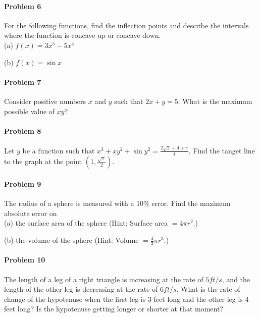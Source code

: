 \documentclass[a4paper,11pt]{article}
\begin{document}
\vspace{2in}

\paragraph{Problem 6}

For the following functions, find the inflection points and describe the intervals where the function is concave up or concave down.\\

(a) $f(x) = 3x^5 - 5x^4$
\vspace{1.5in}

(b) $f(x) = \sin x$
\vspace{1.5in}

\paragraph{Problem 7}
Consider positive numbers $x$ and $y$ such that $2x+y = 5$.  What is the maximum possible value of $xy$?
\vspace{1.5in}

\paragraph{Problem 8}
Let $y$ be a function such that $x^3+xy^2+\sin{y^2} = \frac{2\sqrt{2}+4+\pi}{4}$.  Find the tanget line to the graph at the point $(1, \frac{\sqrt{\pi}}{2})$.
\vspace{2in}

\paragraph{Problem 9}
The radius of a sphere is measured with a $10\%$ error.  Find the maximum absolute error on\\

(a) the surface area of the sphere (Hint: Surface area $= 4 \pi r^2$.)
\vspace{1.5in}

(b) the volume of the sphere
(Hint: Volume $= \frac{4}{3} \pi r^3$.)
\vspace{1.5in}

\paragraph{Problem 10}
The length of a leg of a right triangle is increasing at the rate of $5 ft/s$, and the length of the other leg is decreasing at the rate of $6 ft/s$.  What is the rate of change of the hypotenuse when the first leg is 3 feet long and the other leg is 4 feet long?  Is the hypotenuse getting longer or shorter at that moment?
\vspace{2in}
\end{document}
